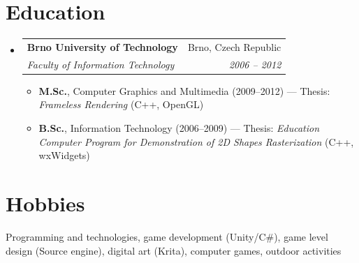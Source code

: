 \documentclass[letterpaper,11pt]{article}
\makeatletter
\newcommand{\resumeItem}[1]{
  \item\small{
    {#1 \vspace{-2pt}}
  }
}
\newcommand{\resumeSubheading}[4]{
  \vspace{-2pt}\item
    \begin{tabular*}{0.97\textwidth}[t]{l@{\extracolsep{\fill}}r}
      \textbf{#1} & #2 \\
      \textit{\small#3} & \textit{\small #4} \\
    \end{tabular*}\vspace{-7pt}
}
\newcommand{\resumeSubHeadingListStart}{\begin{itemize}[leftmargin=0.15in, label={}]}
\newcommand{\resumeSubHeadingListEnd}{\end{itemize}}
\newcommand{\resumeItemListStart}{\begin{itemize}}
\newcommand{\resumeItemListEnd}{\end{itemize}\vspace{-5pt}}
\makeatother
\begin{document}
\section{Education}
  \resumeSubHeadingListStart
    \resumeSubheading
      {Brno University of Technology}{Brno, Czech Republic}
      {Faculty of Information Technology}{2006 -- 2012}
      \resumeItemListStart
        \resumeItem{\textbf{M.Sc.}, Computer Graphics and Multimedia (2009–2012) — Thesis: \emph{Frameless Rendering} (C++, OpenGL)}
        \resumeItem{\textbf{B.Sc.}, Information Technology (2006–2009) — Thesis: \emph{Education Computer Program for Demonstration of 2D Shapes Rasterization} (C++, wxWidgets)}
      \resumeItemListEnd
  \resumeSubHeadingListEnd
  
\section{Hobbies}
{Programming and technologies, game development (Unity/C\#), game level design (Source engine),  digital art (Krita), computer games, outdoor activities}

\end{document}
